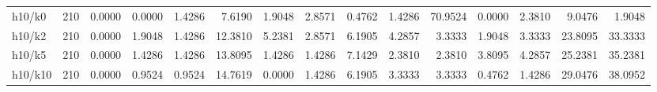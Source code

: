 \begin{tabular}{lrrrrrrrrrrrrrr}
h10/k0 & 210 & 0.0000 & 0.0000 & 1.4286 & 7.6190 & 1.9048 & 2.8571 & 0.4762 & 1.4286 & 70.9524 & 0.0000 & 2.3810 & 9.0476 & 1.9048 \\
h10/k2 & 210 & 0.0000 & 1.9048 & 1.4286 & 12.3810 & 5.2381 & 2.8571 & 6.1905 & 4.2857 & 3.3333 & 1.9048 & 3.3333 & 23.8095 & 33.3333 \\
h10/k5 & 210 & 0.0000 & 1.4286 & 1.4286 & 13.8095 & 1.4286 & 1.4286 & 7.1429 & 2.3810 & 2.3810 & 3.8095 & 4.2857 & 25.2381 & 35.2381 \\
h10/k10 & 210 & 0.0000 & 0.9524 & 0.9524 & 14.7619 & 0.0000 & 1.4286 & 6.1905 & 3.3333 & 3.3333 & 0.4762 & 1.4286 & 29.0476 & 38.0952 \\
\bottomrule
\end{tabular}
